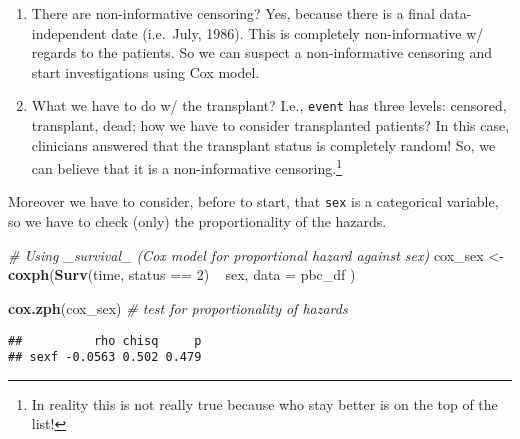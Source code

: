 \documentclass[]{book}
\newenvironment{Shaded}{\begin{snugshade}}{\end{snugshade}}
\newcommand{\KeywordTok}[1]{\textcolor[rgb]{0.13,0.29,0.53}{\textbf{{#1}}}}
\newcommand{\DataTypeTok}[1]{\textcolor[rgb]{0.13,0.29,0.53}{{#1}}}
\newcommand{\DecValTok}[1]{\textcolor[rgb]{0.00,0.00,0.81}{{#1}}}
\newcommand{\StringTok}[1]{\textcolor[rgb]{0.31,0.60,0.02}{{#1}}}
\newcommand{\CommentTok}[1]{\textcolor[rgb]{0.56,0.35,0.01}{\textit{{#1}}}}
\newcommand{\NormalTok}[1]{{#1}}
\let\rmarkdownfootnote\footnote%
\def\footnote{\protect\rmarkdownfootnote}
\theoremstyle{definition}
\theoremstyle{definition}
\theoremstyle{definition}
\theoremstyle{remark}
\begin{document}
\begin{enumerate}
\def\labelenumi{\arabic{enumi}.}
\item
  There are non-informative censoring? Yes, because there is a final
  data-independent date (i.e.~July, 1986). This is completely
  non-informative w/ regards to the patients. So we can suspect a
  non-informative censoring and start investigations using Cox model.
\item
  What we have to do w/ the transplant? I.e., \texttt{event} has three
  levels: censored, transplant, dead; how we have to consider
  transplanted patients? In this case, clinicians answered that the
  transplant status is completely random! So, we can believe that it is
  a non-informative censoring.\footnote{In reality this is not really
    true because who stay better is on the top of the list!}
\end{enumerate}

Moreover we have to consider, before to start, that \texttt{sex} is a
categorical variable, so we have to check (only) the proportionality of
the hazards.

\begin{Shaded}
\begin{Highlighting}[]
\CommentTok{# Using _survival_ (Cox model for proportional hazard against sex)}
\NormalTok{cox_sex <-}\StringTok{ }\KeywordTok{coxph}\NormalTok{(}\KeywordTok{Surv}\NormalTok{(time, status ==}\StringTok{ }\DecValTok{2}\NormalTok{) ~}\StringTok{ }\NormalTok{sex,}
  \DataTypeTok{data =} \NormalTok{pbc_df}
\NormalTok{)}

\KeywordTok{cox.zph}\NormalTok{(cox_sex)                           }\CommentTok{# test for proportionality of hazards}
\end{Highlighting}
\end{Shaded}

\begin{verbatim}
##          rho chisq     p
## sexf -0.0563 0.502 0.479
\end{verbatim}

\begin{Shaded}
\end{Shaded}
\end{document}
